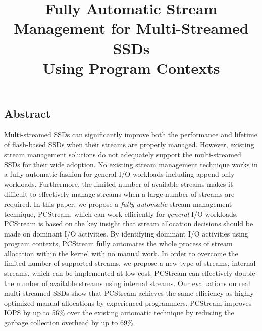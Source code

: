 \documentclass[letterpaper, twocolumn, 10pt]{article}
\begin{document}
\title{
\bf Fully Automatic Stream Management for Multi-Streamed SSDs \\ Using Program Contexts}

%


\maketitle
\subsection*{Abstract}
\vspace{-6pt}
Multi-streamed SSDs
can significantly improve both the performance and lifetime of flash-based SSDs
when their streams are properly managed.  
However, existing stream management solutions do not adequately 
support the multi-streamed SSDs for their wide adoption.
No existing stream management technique works in a fully automatic fashion 
for general I/O workloads including append-only workloads.  
Furthermore, the limited number of available
streams makes it difficult to effectively manage streams 
when a large number of streams are required.
In this paper, we propose a {\it fully automatic} stream
management technique, \textsf{\small PCStream}, which can work efficiently for {\it general} I/O workloads.
\textsf{\small PCStream} is based on the key insight that stream allocation decisions should be made on 
dominant I/O activities. By identifying dominant I/O activities using program contexts, 
\textsf{\small PCStream} fully automates the whole process of stream allocation 
within the kernel with no manual work.
In order to overcome the limited number of supported streams, we propose a new 
type of streams, internal streams, which can be implemented at low cost.
\textsf{\small PCStream} can effectively double the number of available streams using internal streams.
Our evaluations on real multi-streamed SSDs show that 
\textsf{\small PCStream} achieves the same efficiency as highly-optimized manual allocations
by experienced programmers.
\textsf{\small PCStream} improves IOPS by up to 56\% over the existing automatic technique
by reducing the garbage collection overhead by up to 69\%.
\end{document}

